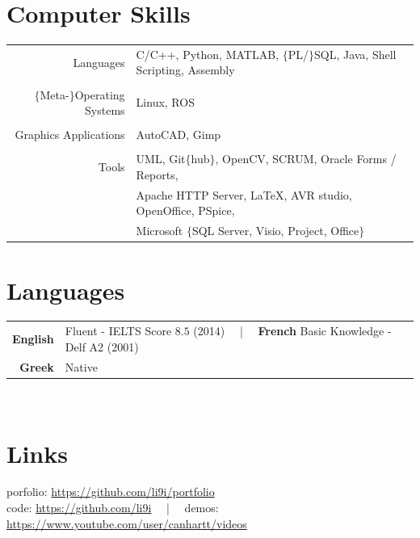 \documentclass[a4paper,10pt,twoside]{article}
\begin{document}
\section{Computer Skills}

\begin{tabular}{rp{12cm}}
Languages & C/C++, Python, MATLAB, $\{$PL/$\}$SQL, Java, Shell Scripting, Assembly \\
&\\
$\{$Meta-$\}$Operating Systems & Linux, ROS \\
&\\
Graphics Applications & AutoCAD, Gimp\\
&\\
  Tools & UML, Git$\{$hub$\}$, OpenCV, SCRUM, Oracle Forms / Reports, \\
  & Apache HTTP Server, \LaTeX, AVR studio, OpenOffice, PSpice,\\
  & Microsoft $\{$SQL Server, Visio, Project, Office$\}$\\
\end{tabular}%



\section{Languages}

\begin{tabular}{rp{12cm}}
\textbf{English} & Fluent - IELTS Score $8.5$ (2014) \ \ | \ \ \textbf{French} Basic Knowledge - Delf A2 (2001) \\
\textbf{Greek} & Native \\
\end{tabular} \\



\section{Links}

\noindent porfolio: \url{https://github.com/li9i/portfolio}\\
code: \url{https://github.com/li9i} \ \ | \ \ demos: \url{https://www.youtube.com/user/canhartt/videos}
\end{document}
